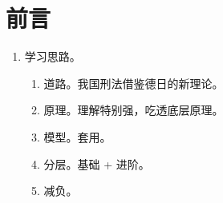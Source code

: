 \section{前言}
\begin{enumerate}
  \item 学习思路。
        \begin{enumerate}
          \item 道路。我国刑法借鉴德日的新理论。
          \item 原理。理解特别强，吃透底层原理。
          \item 模型。套用。
          \item 分层。基础 + 进阶。
          \item 减负。
        \end{enumerate}
\end{enumerate}
